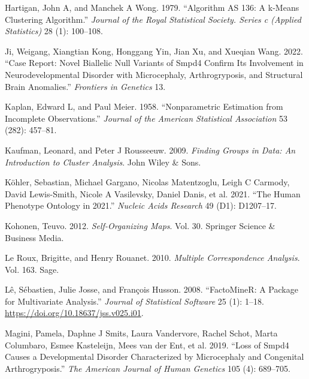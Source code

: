 \documentclass[
  letterpaper,
  DIV=11,
  numbers=noendperiod]{scrartcl}
\newlength{\cslhangindent}
\newlength{\cslentryspacingunit} %
\newenvironment{CSLReferences}[2] %
 {%
  \setlength{\parindent}{0pt}
  \ifodd #1
  \let\oldpar\par
  \def\par{\hangindent=\cslhangindent\oldpar}
  \fi
  \setlength{\parskip}{#2\cslentryspacingunit}
 }%
 {}
\begin{document}
\begin{CSLReferences}{1}{0}
\leavevmode{}%
Hartigan, John A, and Manchek A Wong. 1979. {``Algorithm AS 136: A
k-Means Clustering Algorithm.''} \emph{Journal of the Royal Statistical
Society. Series c (Applied Statistics)} 28 (1): 100--108.

\leavevmode{}%
Ji, Weigang, Xiangtian Kong, Honggang Yin, Jian Xu, and Xueqian Wang.
2022. {``Case Report: Novel Biallelic Null Variants of Smpd4 Confirm Its
Involvement in Neurodevelopmental Disorder with Microcephaly,
Arthrogryposis, and Structural Brain Anomalies.''} \emph{Frontiers in
Genetics} 13.

\leavevmode{}%
Kaplan, Edward L, and Paul Meier. 1958. {``Nonparametric Estimation from
Incomplete Observations.''} \emph{Journal of the American Statistical
Association} 53 (282): 457--81.

\leavevmode{}%
Kaufman, Leonard, and Peter J Rousseeuw. 2009. \emph{Finding Groups in
Data: An Introduction to Cluster Analysis}. John Wiley \& Sons.

\leavevmode{}%
Köhler, Sebastian, Michael Gargano, Nicolas Matentzoglu, Leigh C
Carmody, David Lewis-Smith, Nicole A Vasilevsky, Daniel Danis, et al.
2021. {``The Human Phenotype Ontology in 2021.''} \emph{Nucleic Acids
Research} 49 (D1): D1207--17.

\leavevmode{}%
Kohonen, Teuvo. 2012. \emph{Self-Organizing Maps}. Vol. 30. Springer
Science \& Business Media.

\leavevmode{}%
Le Roux, Brigitte, and Henry Rouanet. 2010. \emph{Multiple
Correspondence Analysis}. Vol. 163. Sage.

\leavevmode{}%
Lê, Sébastien, Julie Josse, and François Husson. 2008. {``{FactoMineR}:
A Package for Multivariate Analysis.''} \emph{Journal of Statistical
Software} 25 (1): 1--18. \url{https://doi.org/10.18637/jss.v025.i01}.

\leavevmode{}%
Magini, Pamela, Daphne J Smits, Laura Vandervore, Rachel Schot, Marta
Columbaro, Esmee Kasteleijn, Mees van der Ent, et al. 2019. {``Loss of
Smpd4 Causes a Developmental Disorder Characterized by Microcephaly and
Congenital Arthrogryposis.''} \emph{The American Journal of Human
Genetics} 105 (4): 689--705.


\end{CSLReferences}
\end{document}
